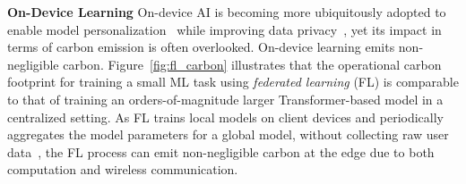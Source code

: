 \textbf{On-Device Learning}
On-device AI is becoming more ubiquitously adopted to enable model personalization~\cite{tinytl, fl_personalization,Bonawitz:arxiv:2019} while improving data privacy~\cite{gboard_prediction, gboard_ctr, gboard_emoji,huba2021papaya}, yet its impact in terms of carbon emission is often overlooked.
%
On-device learning emits non-negligible carbon. Figure~\ref{fig:fl_carbon} illustrates that the operational carbon footprint for training a small ML task using \emph{federated learning} (FL) is comparable to that of training an orders-of-magnitude larger Transformer-based model in a centralized setting.
%
As FL trains local models on client devices and periodically aggregates the model parameters for a global model, without collecting raw user data~\cite{gboard_prediction},
%
the FL process can emit non-negligible carbon at the edge due to both computation and wireless communication. 
%


